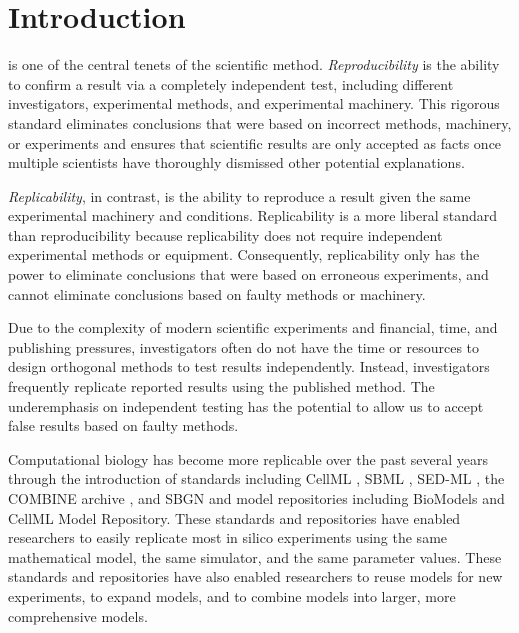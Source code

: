 \documentclass[journal,transmag,twoside]{IEEEtran}
\begin{document}
\section{Introduction}
% 
% 
% 
% 
 is one of the central tenets of the scientific method.
\textit{Reproducibility} is the ability to confirm a result via a completely independent test, including different investigators, experimental methods, and experimental machinery. 
This rigorous standard eliminates conclusions that were based on incorrect methods, machinery, or experiments and ensures that scientific results are only accepted as facts once multiple scientists have thoroughly dismissed other potential explanations. 

\textit{Replicability}, in contrast, is the ability to reproduce a result given the same experimental machinery and conditions. 
Replicability is a more liberal standard than reproducibility because replicability does not require independent experimental methods or equipment.
Consequently, replicability only has the power to eliminate conclusions that were based on erroneous experiments, and cannot eliminate conclusions based on faulty methods or machinery.

Due to the complexity of modern scientific experiments and financial, time, and publishing pressures, investigators often do not have the time or resources to design orthogonal methods to test results independently. Instead, investigators frequently replicate reported results using the published method. The underemphasis on independent testing has the potential to allow us to accept false results based on faulty methods.

Computational biology has become more replicable over the past several years through the introduction of standards including CellML \cite{cuellar2003overview}, SBML \cite{hucka2003}, SED-ML \cite{sedml2011}, the COMBINE archive \cite{COMBINE2012}, and SBGN \cite{LeNovereHMMSS09} and model repositories including BioModels and CellML Model Repository. These standards and repositories have enabled researchers to easily replicate most in silico experiments using the same mathematical model, the same simulator, and the same parameter values. These standards and repositories have also enabled researchers to reuse models for new experiments, to expand models, and to combine models into larger, more comprehensive models.
\end{document}
